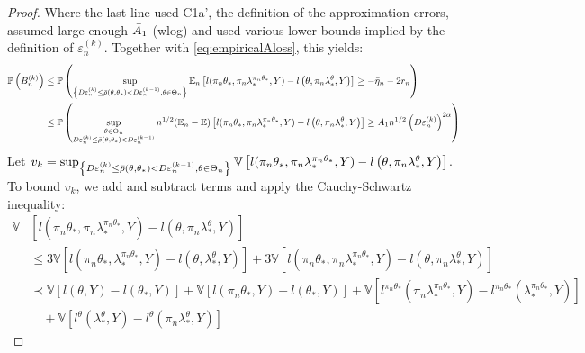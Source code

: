 \documentclass[12pt]{article}
\theoremstyle{myplain}
\theoremstyle{definition}
\theoremstyle{definition}
\theoremstyle{remark}
\numberwithin{equation}{section}
\begin{document}
\begin{proof}
Where the last line used C1a', the definition of the approximation errors, assumed large enough $\Bar A_1$ (wlog) and used various lower-bounds implied by the definition of $\varepsilon_{n}^{(k)}$. Together with \ref{eq:empiricalAloss}, this yields:
\begin{equation*}
\begin{aligned}
\mathbb{P}\left(B_{n}^{(k)}\right) 
& \leq \mathbb{P} \left(\sup_{\left\{D \varepsilon_{n}^{(k)} \leq \Bar\rho\left(\theta, \theta_*\right)<D \varepsilon_{n}^{(k-1)},\theta\in\Theta_n\right\}} \mathbb{E}_n\left[l(\pi_n \theta_*, \pi_{n} \lambda_*^{\pi_n \theta_*}, Y)-l\left(\theta, \pi_{n} \lambda_*^\theta, Y\right)\right] \geq-{\Bar\eta}_{n}- 2 r_n\right)  \\
& \leq \mathbb{P}\left( \sup_{\substack{\theta\in\Theta_n \\ D \varepsilon_{n}^{(k)} \leq \Bar\rho\left(\theta, \theta_*\right)<D \varepsilon_{n}^{(k-1)}}} n^{1 / 2}(\mathbb{E}_n-\mathbb{E})\left[l(\pi_n \theta_*, \pi_{n} \lambda_*^{\pi_n \theta_*}, Y)-l\left(\theta, \pi_{n} \lambda_*^\theta, Y\right)\right] \geq A_{1} n^{1 / 2}\left(D \varepsilon_{n}^{(k)}\right)^{2 {\Bar\alpha}}\right)
\end{aligned}
\end{equation*}
Let $v_{k}=\sup_{\left\{D \varepsilon_{n}^{(k)} \leq \Bar\rho\left(\theta, \theta_*\right)<D \varepsilon_{n}^{(k-1)}, \theta\in\Theta_n\right\}}\mathbb{V}\left[l(\pi_n \theta_*, \pi_{n} \lambda_*^{\pi_n \theta_*}, Y)-l\left(\theta, \pi_{n} \lambda_*^\theta, Y\right)\right]$. To bound $v_k$, we add and subtract terms and apply the Cauchy-Schwartz inequality:
\begin{equation*}
\begin{aligned}
        \mathbb{V} & [l(\pi_n \theta_*, \pi_{n} \lambda_*^{\pi_n \theta_*}, Y)-l(\theta, \pi_{n} \lambda_*^\theta, Y)] \\
        & \leq 3  \mathbb{V}[l(\pi_n \theta_*, \lambda_*^{\pi_n \theta_*}, Y)-l(\theta, \lambda_*^\theta, Y)] + 3 \mathbb{V}[l(\pi_n \theta_*, \pi_{n} \lambda_*^{\pi_n \theta_*}, Y)-l(\theta, \pi_{n} \lambda_*^\theta, Y)]\\
        & \prec \mathbb{V}[l(\theta, Y) - l(\theta_*, Y)]+\mathbb{V}[l(\pi_n \theta_*, Y) - l(\theta_*, Y)] + \mathbb{V}[l^{\pi_n \theta_*}(\pi_{n} \lambda_*^{\pi_n \theta_*}, Y)-l^{\pi_n \theta_*}(\lambda_*^{\pi_n \theta_*}, Y)] \\
        & \quad + \mathbb{V}[l^\theta(\lambda_*^\theta, Y)-l^\theta(\pi_{n} \lambda_*^\theta, Y)]

\end{aligned}
\end{equation*}
\end{proof}
\end{document}
